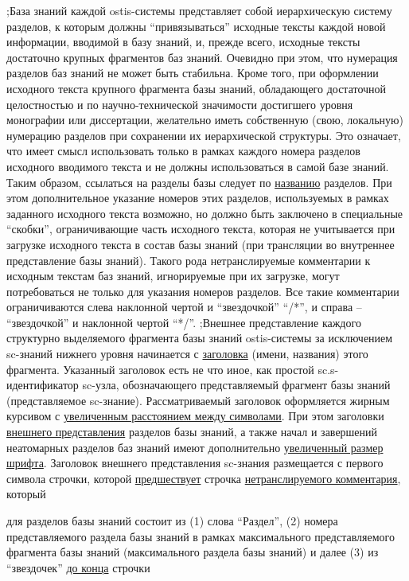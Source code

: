 \begin{SCn}
{;База знаний каждой ostis-системы представляет собой иерархическую систему разделов, к которым должны ``привязываться'' исходные тексты каждой новой информации, вводимой в базу знаний, и, прежде всего, исходные тексты достаточно крупных фрагментов баз знаний.  Очевидно при этом, что нумерация разделов баз знаний не может быть стабильна. Кроме того, при оформлении исходного текста крупного фрагмента базы знаний, обладающего достаточной целостностью и по научно-технической значимости достигшего уровня монографии или диссертации, желательно иметь собственную (свою, локальную) нумерацию разделов при сохранении их иерархической структуры. Это означает, что имеет смысл использовать только в рамках каждого номера разделов исходного вводимого текста и не должны использоваться в самой базе знаний. Таким образом, ссылаться на разделы базы следует по \uline{названию} разделов. При этом дополнительное указание номеров этих разделов, используемых в рамках заданного исходного текста возможно, но должно быть заключено в специальные ``скобки'', ограничивающие часть исходного текста, которая не учитывается при загрузке исходного текста в состав базы знаний (при трансляции во внутреннее представление базы знаний). Такого рода нетранслируемые комментарии к исходным текстам баз знаний, игнорируемые при их загрузке, могут потребоваться не только для указания номеров разделов. Все такие комментарии ограничиваются слева наклонной чертой и ``звездочкой'' ``/*'', и справа --  ``звездочкой'' и наклонной чертой ``*/''.
;Внешнее представление каждого структурно выделяемого фрагмента базы знаний ostis-системы за исключением sc-знаний нижнего уровня начинается с \uline{заголовка} (имени, названия) этого фрагмента. Указанный заголовок есть не что иное, как простой sc.s-идентификатор sc-узла, обозначающего представляемый фрагмент базы знаний (представляемое sc-знание). Рассматриваемый заголовок оформляется жирным курсивом с \uline{увеличенным расстоянием между символами}. При этом заголовки \uline{внешнего представления} разделов базы знаний, а также начал и завершений неатомарных разделов баз знаний имеют дополнительно \uline{увеличенный размер шрифта}. Заголовок внешнего представления sc-знания размещается с первого символа строчки, которой \uline{предшествует} строчка \uline{нетранслируемого комментария}, который 
\begin{scnitemize}
    \item для разделов базы знаний состоит из (1) слова ``Раздел'', (2) номера представляемого раздела базы знаний в рамках максимального представляемого фрагмента базы знаний (максимального раздела базы знаний) и далее (3) из ``звездочек'' \uline{до конца} строчки

\end{scnitemize}}
\end{SCn}
